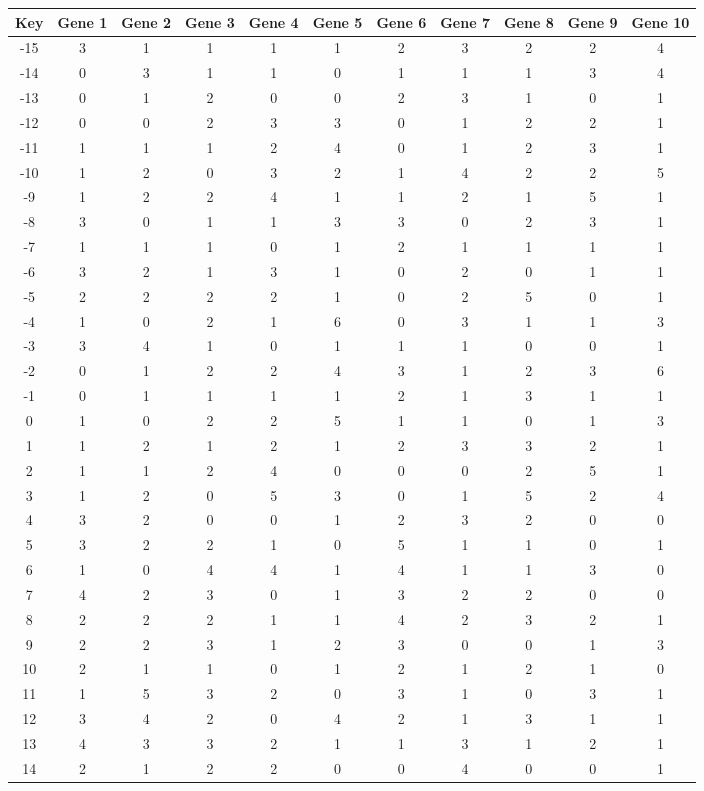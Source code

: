 \begin{tabular}{|c|c|c|c|c|c|c|c|c|c|c|}
\hline
Key & Gene 1 & Gene 2 & Gene 3 & Gene 4 & Gene 5 & Gene 6 & Gene 7 & Gene 8 & Gene 9 & Gene 10 \\
\hline
-15 & 3 & 1 & 1 & 1 & 1 & 2 & 3 & 2 & 2 & 4 \\
-14 & 0 & 3 & 1 & 1 & 0 & 1 & 1 & 1 & 3 & 4 \\
-13 & 0 & 1 & 2 & 0 & 0 & 2 & 3 & 1 & 0 & 1 \\
-12 & 0 & 0 & 2 & 3 & 3 & 0 & 1 & 2 & 2 & 1 \\
-11 & 1 & 1 & 1 & 2 & 4 & 0 & 1 & 2 & 3 & 1 \\
-10 & 1 & 2 & 0 & 3 & 2 & 1 & 4 & 2 & 2 & 5 \\
-9 & 1 & 2 & 2 & 4 & 1 & 1 & 2 & 1 & 5 & 1 \\
-8 & 3 & 0 & 1 & 1 & 3 & 3 & 0 & 2 & 3 & 1 \\
-7 & 1 & 1 & 1 & 0 & 1 & 2 & 1 & 1 & 1 & 1 \\
-6 & 3 & 2 & 1 & 3 & 1 & 0 & 2 & 0 & 1 & 1 \\
-5 & 2 & 2 & 2 & 2 & 1 & 0 & 2 & 5 & 0 & 1 \\
-4 & 1 & 0 & 2 & 1 & 6 & 0 & 3 & 1 & 1 & 3 \\
-3 & 3 & 4 & 1 & 0 & 1 & 1 & 1 & 0 & 0 & 1 \\
-2 & 0 & 1 & 2 & 2 & 4 & 3 & 1 & 2 & 3 & 6 \\
-1 & 0 & 1 & 1 & 1 & 1 & 2 & 1 & 3 & 1 & 1 \\
0 & 1 & 0 & 2 & 2 & 5 & 1 & 1 & 0 & 1 & 3 \\
1 & 1 & 2 & 1 & 2 & 1 & 2 & 3 & 3 & 2 & 1 \\
2 & 1 & 1 & 2 & 4 & 0 & 0 & 0 & 2 & 5 & 1 \\
3 & 1 & 2 & 0 & 5 & 3 & 0 & 1 & 5 & 2 & 4 \\
4 & 3 & 2 & 0 & 0 & 1 & 2 & 3 & 2 & 0 & 0 \\
5 & 3 & 2 & 2 & 1 & 0 & 5 & 1 & 1 & 0 & 1 \\
6 & 1 & 0 & 4 & 4 & 1 & 4 & 1 & 1 & 3 & 0 \\
7 & 4 & 2 & 3 & 0 & 1 & 3 & 2 & 2 & 0 & 0 \\
8 & 2 & 2 & 2 & 1 & 1 & 4 & 2 & 3 & 2 & 1 \\
9 & 2 & 2 & 3 & 1 & 2 & 3 & 0 & 0 & 1 & 3 \\
10 & 2 & 1 & 1 & 0 & 1 & 2 & 1 & 2 & 1 & 0 \\
11 & 1 & 5 & 3 & 2 & 0 & 3 & 1 & 0 & 3 & 1 \\
12 & 3 & 4 & 2 & 0 & 4 & 2 & 1 & 3 & 1 & 1 \\
13 & 4 & 3 & 3 & 2 & 1 & 1 & 3 & 1 & 2 & 1 \\
14 & 2 & 1 & 2 & 2 & 0 & 0 & 4 & 0 & 0 & 1 \\
\hline
\end{tabular}
